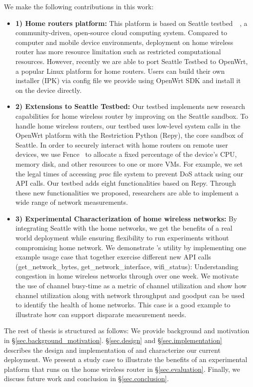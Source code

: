 We make the following contributions in this work:
\begin{itemize}
\item\textbf{1) Home routers platform:} This platform is based on Seattle testbed~\cite{zhuang2013experience}~\cite{cappos2009seattle}, a community-driven, open-source cloud computing system. Compared to computer and mobile device environments, deployment on home wireless router has more resource limitation such as restricted computational resources. However, recently we are able to port Seattle Testbed to OpenWrt, a popular Linux platform for home routers\cite{openwrt}. Users can build their own \sysname installer (IPK) via config file we provide using OpenWrt SDK and install it on the device directly. 
\item\textbf{2) Extensions to Seattle Testbed:}  Our testbed implements new research capabilities for home wireless router by improving on the Seattle sandbox. To handle home wireless routers, our testbed uses low-level system calls in the OpenWrt platform with the Restriction Python (Repy)\cite{cappos2010retaining}, the core sandbox of Seattle. In order to securely interact with home routers on remote user devices, we use Fence~\cite{li2015fence} to allocate a fixed percentage of the device's CPU, memory disk, and other resources to one or more VMs. For example, we set the legal times of accessing \textit{proc} file system to prevent DoS attack using our API calls. Our testbed adds eight functionalities based on Repy. Through these new functionalities we proposed, researchers are able to implement a wide range of network measurements.
\item\textbf{3) Experimental Characterization of home wireless networks:} By integrating Seattle with the home networks, we get the benefits of a real world deployment while ensuring flexibility to run experiments without compromising home network. We demonstrate \sysname's utility by implementing one example usage case that together exercise different new API calls (get\_network\_bytes, get\_network\_interface, wifi\_status): Understanding congestion in home wireless networks through \sysname over one week. We motivate the use of channel busy-time as a metric of channel utilization and show how channel utilization along with network throughput and goodput can be used to identify the health of home networks. This case is a good example to illustrate how \sysname can support disparate measurement needs.
\end{itemize}

The rest of thesis is structured as follows: We provide background and motivation in \S{\ref{sec.background_motivation}}. \S{\ref{sec.design}} and \S{\ref{sec.implementation}} describes the design and implementation of \sysname and characterize our current deployment. We present a study case to illustrate the benefits of an experimental platform that runs on the home wireless router in \S{\ref{sec.evaluation}}. Finally, we discuss future work and conclusion in \S{\ref{sec.conclusion}}. 